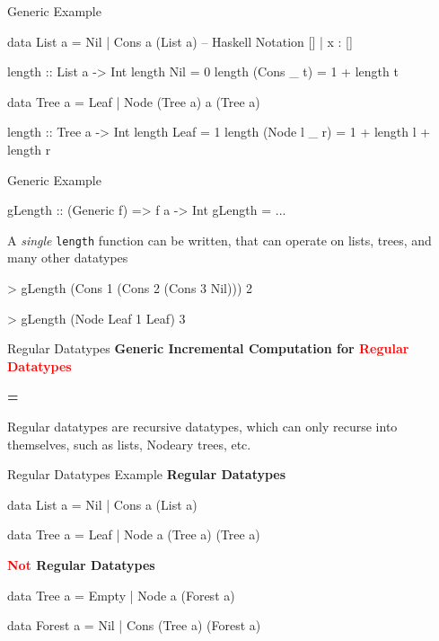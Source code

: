 \begin{slide}{Generic Example}
\begin{haskell}
data List a = Nil | Cons a (List a) -- Haskell Notation [] | x : [] 

length :: List a -> Int
length Nil        = 0
length (Cons _ t) = 1 + length t

data Tree a = Leaf | Node (Tree a) a (Tree a)

length :: Tree a -> Int
length Leaf         = 1
length (Node l _ r) = 1 + length l + length r
\end{haskell}
\end{slide}

\begin{slide}{Generic Example}
\begin{chaskell}
gLength :: (Generic f) => f a -> Int
gLength = ...
\end{chaskell}

A \textit{single} \texttt{length} function can be written, that can operate on lists, trees, and many other datatypes

\vspace*{0.5cm}
\begin{haskell}
> gLength (Cons 1 (Cons 2 (Cons 3 Nil)))
    2

> gLength (Node Leaf 1 Leaf)
    3
\end{haskell}
\end{slide}


\begin{slide}{Regular Datatypes}
\centering
\large \textbf{Generic Incremental Computation for \textcolor{red}{Regular Datatypes}}

\vspace*{.5cm}
\textbf{=}
\vspace*{.5cm}

Regular datatypes are recursive datatypes, which can only recurse into themselves, such as lists, Nodeary trees, etc. 

\end{slide}


\begin{slide}{Regular Datatypes Example}
\textbf{Regular Datatypes}

\begin{haskell}
data List a = Nil | Cons a (List a)

data Tree a = Leaf | Node a (Tree a) (Tree a)
\end{haskell}

\vspace*{0.5cm}
\textbf{\textcolor{red}{Not} Regular Datatypes}

\begin{haskell}
data Tree a = Empty | Node a (Forest a)

data Forest a = Nil | Cons (Tree a) (Forest a)
\end{haskell}
\end{slide}